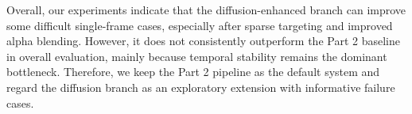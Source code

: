 Overall, our experiments indicate that the diffusion-enhanced branch can improve some difficult single-frame cases, especially after sparse targeting and improved alpha blending.
However, it does not consistently outperform the Part 2 baseline in overall evaluation, mainly because temporal stability remains the dominant bottleneck.
Therefore, we keep the Part 2 pipeline as the default system and regard the diffusion branch as an exploratory extension with informative failure cases.